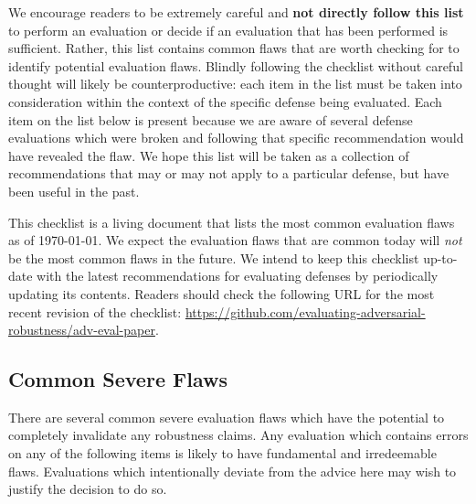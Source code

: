 \documentclass{article} %
\begin{document}
We encourage readers to be extremely careful and \textbf{not directly follow
  this list} to perform an evaluation or decide if an evaluation that has been
performed is sufficient.
%
Rather, this list contains common flaws that are worth checking for to
identify potential evaluation flaws.
%
Blindly following the checklist without careful thought will likely be counterproductive:
each item in the list must be taken into consideration within the context
of the specific defense being evaluated. 
%
Each item on the list below is present because we are aware of several defense
evaluations which were broken and following that specific recommendation would have
revealed the flaw.
%
We hope this list will be taken as a collection of recommendations that may
or may not apply to a particular defense, but have been useful in the past.

This checklist is a living document that lists the most common evaluation
flaws as of \today. We expect the evaluation flaws that are
common today will \emph{not} be the most common flaws in the future.
%
We intend to keep this checklist up-to-date with the latest recommendations
for evaluating defenses by periodically updating its contents.
Readers should check the following URL  for the most recent
revision of the checklist:
\url{https://github.com/evaluating-adversarial-robustness/adv-eval-paper}.



\subsection{Common Severe Flaws}
There are several common severe evaluation flaws which have the
potential to completely invalidate any robustness claims.
%
Any evaluation which contains errors on any of the following
items is likely to have fundamental and irredeemable flaws.
%
Evaluations which intentionally deviate from the advice here may wish to
justify the decision to do so.
\end{document}
